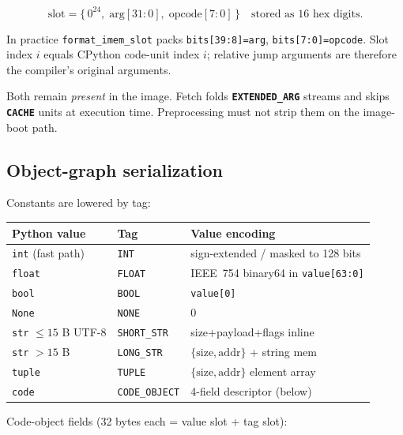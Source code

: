 \documentclass[11pt,a4paper]{article}
\newcommand{\opcode}[1]{\texttt{\textbf{#1}}}
\newcommand{\tagname}[1]{\texttt{#1}}
\newcommand{\bitfield}[1]{\texttt{#1}}
\begin{document}
\begin{equation}
  \mathrm{slot} = \{\,0^{24},\; \mathrm{arg}[31{:}0],\; \mathrm{opcode}[7{:}0]\,\}
  \quad\text{stored as 16 hex digits.}
\end{equation}

In practice \texttt{format\_imem\_slot} packs \texttt{bits[39:8]=arg},
\texttt{bits[7:0]=opcode}. Slot index $i$ equals CPython code-unit index $i$;
relative jump arguments are therefore the compiler's original arguments.

\begin{specbox}
Both remain \emph{present} in the image. Fetch folds \opcode{EXTENDED\_ARG}
streams and skips \opcode{CACHE} units at execution time. Preprocessing must
not strip them on the image-boot path.
\end{specbox}

\subsection{Object-graph serialization}

Constants are lowered by tag:

\begin{center}
\begin{tabular}{@{}lll@{}}
\toprule
\textbf{Python value} & \textbf{Tag} & \textbf{Value encoding} \\
\midrule
\texttt{int} (fast path) & \tagname{INT} & sign-extended / masked to 128 bits \\
\texttt{float} & \tagname{FLOAT} & IEEE~754 binary64 in \bitfield{value[63:0]} \\
\texttt{bool} & \tagname{BOOL} & \bitfield{value[0]} \\
\texttt{None} & \tagname{NONE} & 0 \\
\texttt{str} $\le 15$ B UTF-8 & \tagname{SHORT\_STR} & size+payload+flags inline \\
\texttt{str} $> 15$ B & \tagname{LONG\_STR} & $\{\mathrm{size},\mathrm{addr}\}$ + string mem \\
\texttt{tuple} & \tagname{TUPLE} & $\{\mathrm{size},\mathrm{addr}\}$ element array \\
\texttt{code} & \tagname{CODE\_OBJECT} & 4-field descriptor (below) \\
\bottomrule
\end{tabular}
\end{center}

Code-object fields (32 bytes each = value slot + tag slot):
\end{document}
